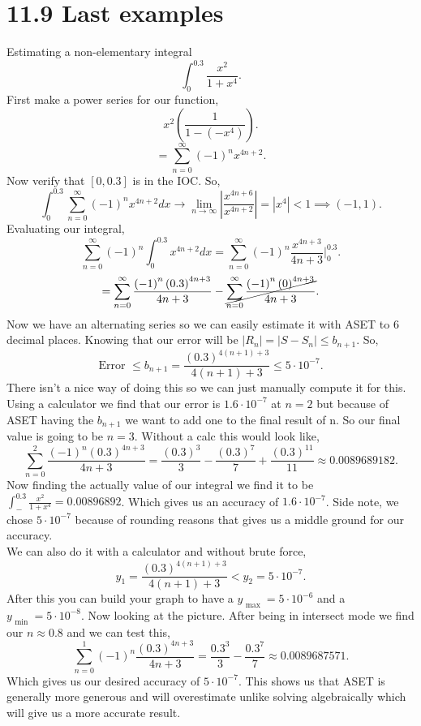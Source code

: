 \section{11.9 Last examples}%
\label{sec:11.9 Last example}
\begin{exampleblock}{Estimating a non-elementary integral}
\[
\int_{ 0 }^{ 0.3 } \frac{ x^2 }{ 1+x^{ 4 } }
.\] 
First make a power series for our function,
\[
x^2\left( \frac{ 1 }{ 1-\left( -x^{ 4 } \right)  }  \right) 
.\] 
\[
=\sum_{ n=0 } ^{ \infty } \left( -1 \right) ^{ n }x^{ 4n+2 }
.\] 
Now verify that $ \left[ 0,0.3 \right]  $ is in the IOC. So,
\[
\int_{ 0 }^{ 0.3 } \sum_{ n=0 } ^{ \infty } \left( -1 \right) ^{ n }x^{ 4n+2 }dx \to \lim_{ n \to \infty} \left| \frac{ x^{ 4n+6 } }{ x^{ 4n+2 } } \right|= \left| x^{ 4 } \right| < 1 \implies \left( -1,1 \right) 
.\] 
Evaluating our integral,
\[
\sum_{ n=0 } ^{ \infty } \left( -1 \right) ^{ n }\int_{ 0 }^{ 0.3 } x^{ 4n+2 }dx = \sum_{ n=0 } ^{ \infty } \left( -1 \right) ^{ n } \frac{ x^{ 4n+3 } }{ 4n + 3 } \bigg| _{ 0 }^{ 0.3 }
.\] 
\[
	=\sum_{ n=0 } ^{ \infty } \frac{ \left( -1 \right) ^{ n } \left( 0.3 \right) ^{ 4n+3 } }{ 4n+3 } - \cancel{\sum_{ n=0 } ^{ \infty } \frac{ \left( -1 \right) ^{ n }\left( 0 \right) ^{ 4n+3 } }{ 4n+3 }}
.\] 
Now we have an alternating series so we can easily estimate it with ASET to 6 decimal places. Knowing that our error will be $ \left| R_n \right|= \left| S-S_n \right| \le b_{ n+1 } $. So,
\[
\text{Error }\le b_{ n+1 } = \frac{ \left( 0.3 \right) ^{ 4\left( n+1 \right) +3 } }{ 4\left( n+1 \right) +3 } \le 5\cdot 10^{ -7 }
.\] 
There isn't a nice way of doing this so we can just manually compute it for this. Using a calculator we find that our error is $ 1.6\cdot 10^{ -7 } $ at $ n=2 $ but because of ASET having the $ b_{ n+1 } $ we want to add one to the final result of n. So our final value is going to be $ n=3 $. Without a calc this would look like,
\[
\sum_{ n=0 } ^{ 2 } \frac{ \left( -1 \right) ^{ n }\left( 0.3 \right) ^{ 4n+3 } }{ 4n+3 } = \frac{ \left( 0.3 \right) ^{ 3 } }{ 3 } - \frac{ \left( 0.3 \right) ^{ 7 } }{ 7 } + \frac{ \left( 0.3 \right) ^{ 11 } }{ 11 } \approx 0.0089689182
.\] 
\newpage
Now finding the actually value of our integral we find it to be $ \int_{ - }^{ 0.3 } \frac{ x^2 }{ 1+x^{ 4 } } = 0.00896892$. Which gives us an accuracy of $ 1.6\cdot 10^{ -7 } $. Side note, we chose $ 5\cdot 10^{ -7 } $ because of rounding reasons that gives us a middle ground for our accuracy. \\
We can also do it with a calculator and without brute force,
\[
y_1 = \frac{ \left( 0.3 \right) ^{ 4\left( n+1 \right) +3 } }{ 4\left( n+1 \right) +3 }< y_2 = 5\cdot 10^{ -7 }
.\] 
After this you can build your graph to have a $ y_{ \text{ max } }= 5\cdot 10^{ -6 } $ and a $ y_{ \text{ min } }= 5\cdot 10^{ -8 } $. Now looking at the picture. After being in intersect mode we find our $ n\approx 0.8 $ and we can test this,
\[
\sum_{ n=0 } ^{ 1 } \left( -1 \right) ^{ n } \frac{ \left( 0.3 \right) ^{ 4n+3 } }{ 4n+3 } = \frac{ 0.3^{ 3 } }{ 3 }- \frac{ 0.3^{ 7 } }{ 7 } \approx 0.0089687571
.\] 
Which gives us our desired accuracy of $ 5\cdot 10^{ -7 } $. This shows us that ASET is generally more generous and will overestimate unlike solving algebraically which will give us a more accurate result.
\end{exampleblock}

